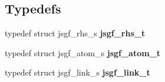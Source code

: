 \subsection*{Typedefs}
\begin{CompactItemize}
\item 
typedef struct jsgf\_\-rhs\_\-s \textbf{jsgf\_\-rhs\_\-t}\label{jsgf__internal_8h_d8fc00ae94c7a558005de3e89c35142f}

\item 
typedef struct jsgf\_\-atom\_\-s \textbf{jsgf\_\-atom\_\-t}\label{jsgf__internal_8h_439a04913bdb6a58d86ad152b952f0ee}

\item 
typedef struct jsgf\_\-link\_\-s \textbf{jsgf\_\-link\_\-t}\label{jsgf__internal_8h_5b84ef71c936d856751f19992a7245eb}

\end{CompactItemize}
